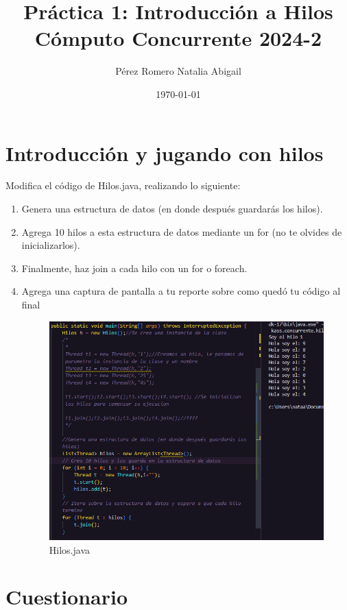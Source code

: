 \documentclass{article}
\title{Práctica 1: Introducción a Hilos \\ Cómputo Concurrente 2024-2}
\author{Pérez Romero Natalia Abigail}
\date{\today}
\begin{document}
\maketitle

\section{Introducción y jugando con hilos}

Modifica el código de Hilos.java, realizando lo siguiente:
\begin{enumerate}
    \item Genera una estructura de datos (en donde después guardarás los hilos).
    \item Agrega 10 hilos a esta estructura de datos mediante un for (no te olvides de inicializarlos).
    \item Finalmente, haz join a cada hilo con un for o foreach.
    \item Agrega una captura de pantalla a tu reporte sobre como quedó tu código al final
    \begin{figure}[h!]
        \centering
        \includegraphics[width=\textwidth]{intro1.png}
        \caption{Hilos.java}
    \end{figure}
\end{enumerate}

\newpage
\section{Cuestionario}
\end{document}

